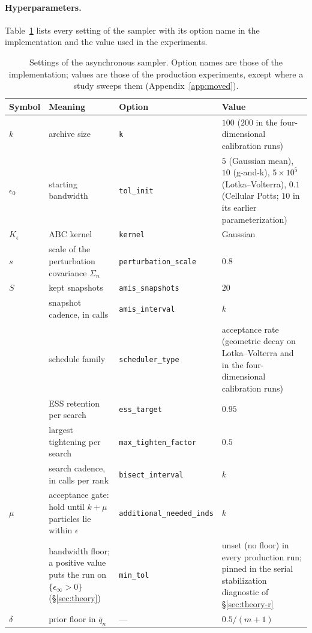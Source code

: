 \documentclass[10pt]{article}
\theoremstyle{plain}
\theoremstyle{definition}
\begin{document}
\paragraph{Hyperparameters.} Table~\ref{tab:hyperparameters} lists every setting of the sampler with its option name in the implementation and the value used in the experiments.
\begin{table}[h]
\caption{Settings of the asynchronous sampler. Option names are those of the implementation; values are those of the production experiments, except where a study sweeps them (Appendix~\ref{app:moved}).}\label{tab:hyperparameters}
\centering
\footnotesize
\begin{tabular}{@{}>{\raggedright\arraybackslash}p{}>{\raggedright\arraybackslash}p{}>{\raggedright\arraybackslash}p{}>{\raggedright\arraybackslash}p{}@{}}
\toprule
Symbol & Meaning & Option & Value \\
\midrule
$k$ & archive size & \texttt{k} & $100$ ($200$ in the four-dimensional calibration runs) \\
$\epsilon_0$ & starting bandwidth & \texttt{tol\_init} & $5$ (Gaussian mean), $10$ (g-and-k), $5\times10^{5}$ (Lotka--Volterra), $0.1$ (Cellular Potts; $10$ in its earlier parameterization) \\
$K_\epsilon$ & ABC kernel & \texttt{kernel} & Gaussian \\
$s$ & scale of the perturbation covariance $\Sigma_n$ & \texttt{perturbation\_scale} & $0.8$ \\
$S$ & kept snapshots & \texttt{amis\_snapshots} & $20$ \\
 & snapshot cadence, in calls & \texttt{amis\_interval} & $k$ \\
 & schedule family & \texttt{scheduler\_type} & acceptance rate (geometric decay on Lotka--Volterra and in the four-dimensional calibration runs) \\
 & ESS retention per search & \texttt{ess\_target} & $0.95$ \\
 & largest tightening per search & \texttt{max\_tighten\_factor} & $0.5$ \\
 & search cadence, in calls per rank & \texttt{bisect\_interval} & $k$ \\
$\mu$ & acceptance gate: hold until $k+\mu$ particles lie within $\epsilon$ & \texttt{additional\_needed\_inds} & $k$ \\
 & bandwidth floor; a positive value puts the run on $\{\epsilon_\infty>0\}$ (\S\ref{sec:theory}) & \texttt{min\_tol} & unset (no floor) in every production run; pinned in the serial stabilization diagnostic of \S\ref{sec:theory-r} \\
$\delta$ & prior floor in $\bar q_n$ & --- & $0.5/(m{+}1)$ \\
\bottomrule
\end{tabular}
\end{table}
\end{document}
